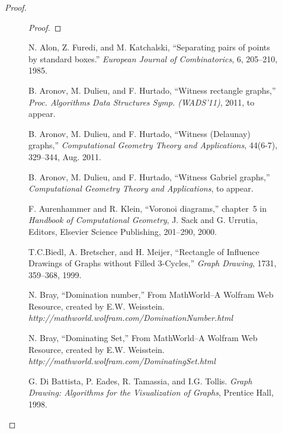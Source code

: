 \documentclass{llncs}
\begin{document}
\begin{proof}
\begin{figure}
\begin{proof}
\hfill 





\end{proof}
  












\begin{thebibliography}{99}



 N. Alon, Z. Furedi, and M. Katchalski,
``Separating pairs of  points by standard boxes.''
\emph{European Journal of Combinatorics},
6, 205--210, 1985.

 B. Aronov, M. Dulieu, and F. Hurtado, ``Witness
  rectangle graphs,'' \emph{Proc. Algorithms Data Structures
    Symp. (WADS'11)}, 2011, to appear.

 B. Aronov, M. Dulieu, and F. Hurtado, ``Witness
  (Delaunay) graphs,'' \emph{Computational Geometry Theory and Applications}, 44(6-7),
  329--344, Aug. 2011.
  


 B. Aronov, M. Dulieu, and F. Hurtado, ``Witness Gabriel
  graphs,''  \emph{Computational Geometry Theory and Applications}, to appear.


 F. Aurenhammer and R. Klein, ``Voronoi
  diagrams,'' chapter~5 in \emph{Handbook of Computational Geometry},
  J. Sack and G. Urrutia, Editors, Elsevier Science Publishing,
  201--290, 2000.
  
   T.C.Biedl, A. Bretscher, and H. Meijer,
  ``Rectangle of Influence Drawings of Graphs without Filled 3-Cycles,''
  \emph{Graph Drawing},
  1731, 359--368, 1999.
  
     N. Bray, ``Domination number,'' From
  MathWorld--A Wolfram Web
  Resource, created by E.W. Weisstein. \textsl{http://mathworld.wolfram.com/DominationNumber.html}
  
      N. Bray, ``Dominating Set,'' From
  MathWorld--A Wolfram Web
  Resource, created by E.W. Weisstein. \textsl{http://mathworld.wolfram.com/DominatingSet.html}

G. Di Battista, P. Eades, R. Tamassia, and I.G. Tollis.
\newblock \emph{Graph Drawing: Algorithms for the Visualization of Graphs},
\newblock Prentice Hall, 1998.


\end{thebibliography}
\end{figure}
\end{proof}
\end{document}
